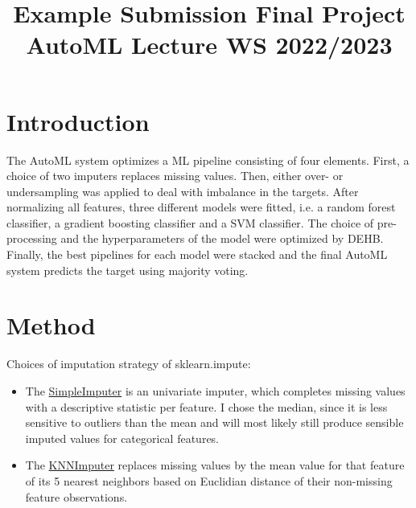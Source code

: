 \documentclass[11pt]{article}
\title{Example Submission Final Project AutoML Lecture WS 2022/2023}
\author[1]{\nameemail{Constantin von Crailsheim}{C.Crailsheim@campus.lmu.de}}
\affil[1]{LMU Munich, Institute of Statistics}
\begin{document}
\maketitle

\begin{abstract}
\end{abstract}



\section{Introduction}


The AutoML system optimizes a ML pipeline consisting of four elements. First, a choice of two imputers replaces missing values. Then, either over- or undersampling was applied to deal with imbalance in the targets. After normalizing all features, three different models were fitted, i.e. a random forest classifier, a gradient boosting classifier and a SVM classifier. The choice of pre-processing and the hyperparameters of the model were optimized by DEHB. Finally, the best pipelines for each model were stacked and the final AutoML system predicts the target using majority voting.

\section{Method}

Choices of imputation strategy of sklearn.impute:
\begin{itemize}
\item The \href{https://scikit-learn.org/stable/modules/generated/sklearn.impute.SimpleImputer.html}{SimpleImputer} is an univariate imputer, which completes missing values with a descriptive statistic per feature. I chose the median, since it is less sensitive to outliers than the mean and will most likely still produce sensible imputed values for categorical features.
\item The \href{https://scikit-learn.org/stable/modules/generated/sklearn.impute.KNNImputer.html#sklearn.impute.KNNImputer}{KNNImputer} replaces missing values by the mean value for that feature of its 5 nearest neighbors based on Euclidian distance of their non-missing feature observations. 
\end{itemize}
\end{document}
